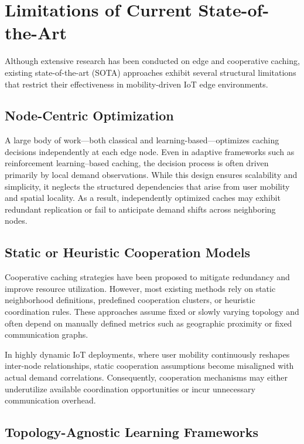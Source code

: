 \section{Limitations of Current State-of-the-Art}

Although extensive research has been conducted on edge and cooperative caching, existing state-of-the-art (SOTA) approaches exhibit several structural limitations that restrict their effectiveness in mobility-driven IoT edge environments.

\subsection{Node-Centric Optimization}

A large body of work—both classical and learning-based—optimizes caching decisions independently at each edge node. Even in adaptive frameworks such as reinforcement learning–based caching, the decision process is often driven primarily by local demand observations. While this design ensures scalability and simplicity, it neglects the structured dependencies that arise from user mobility and spatial locality. As a result, independently optimized caches may exhibit redundant replication or fail to anticipate demand shifts across neighboring nodes.

\subsection{Static or Heuristic Cooperation Models}

Cooperative caching strategies have been proposed to mitigate redundancy and improve resource utilization. However, most existing methods rely on static neighborhood definitions, predefined cooperation clusters, or heuristic coordination rules. These approaches assume fixed or slowly varying topology and often depend on manually defined metrics such as geographic proximity or fixed communication graphs.

In highly dynamic IoT deployments, where user mobility continuously reshapes inter-node relationships, static cooperation assumptions become misaligned with actual demand correlations. Consequently, cooperation mechanisms may either underutilize available coordination opportunities or incur unnecessary communication overhead.

\subsection{Topology-Agnostic Learning Frameworks}

